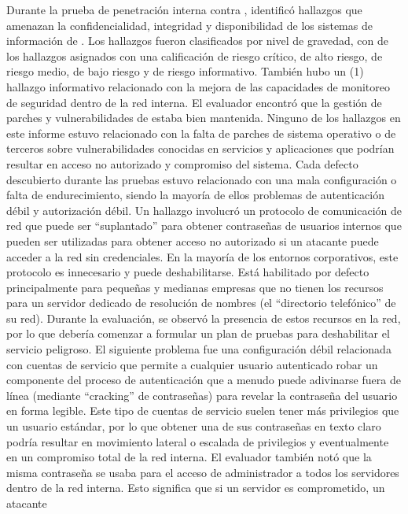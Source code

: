 \qquad Durante la prueba de penetración interna contra \enterpriseName, \brandName identificó \the\numexpr\totalCount\relax hallazgos que
amenazan la confidencialidad, integridad y disponibilidad de los sistemas de información de \enterpriseName. Los hallazgos fueron
clasificados por nivel de gravedad, con \countCritical de los hallazgos asignados con una calificación de riesgo crítico, \countHigh de alto riesgo, \countMedium de riesgo medio, 
\countLow de bajo riesgo y \countInfo de riesgo informativo. También hubo un (1) hallazgo informativo relacionado con la mejora de las capacidades de monitoreo de seguridad dentro de la
red interna.
El evaluador encontró que la gestión de parches y vulnerabilidades de \enterpriseName estaba bien mantenida. Ninguno de los hallazgos en este
informe estuvo relacionado con la falta de parches de sistema operativo o de terceros sobre vulnerabilidades conocidas en servicios y
aplicaciones que podrían resultar en acceso no autorizado y compromiso del sistema. Cada defecto descubierto durante las pruebas estuvo
relacionado con una mala configuración o falta de endurecimiento, siendo la mayoría de ellos problemas de autenticación débil y
autorización débil.
Un hallazgo involucró un protocolo de comunicación de red que puede ser “suplantado” para obtener contraseñas de usuarios internos
que pueden ser utilizadas para obtener acceso no autorizado si un atacante puede acceder a la red sin credenciales. En la mayoría de los entornos corporativos,
este protocolo es innecesario y puede deshabilitarse. Está habilitado por defecto principalmente para pequeñas y medianas empresas que no tienen los recursos para un servidor dedicado de resolución de nombres (el
“directorio telefónico” de su red). Durante la evaluación, se observó la presencia de estos recursos en la
red, por lo que \enterpriseName debería comenzar a formular un plan de pruebas para deshabilitar el servicio peligroso.
El siguiente problema fue una configuración débil relacionada con cuentas de servicio que permite a cualquier usuario autenticado robar un
componente del proceso de autenticación que a menudo puede adivinarse fuera de línea (mediante “cracking” de contraseñas) para revelar la
contraseña del usuario en forma legible. Este tipo de cuentas de servicio suelen tener más privilegios que un
usuario estándar, por lo que obtener una de sus contraseñas en texto claro podría resultar en movimiento lateral o escalada de privilegios
y eventualmente en un compromiso total de la red interna. El evaluador también notó que la misma contraseña se usaba para
el acceso de administrador a todos los servidores dentro de la red interna. Esto significa que si un servidor es comprometido, un atacante
